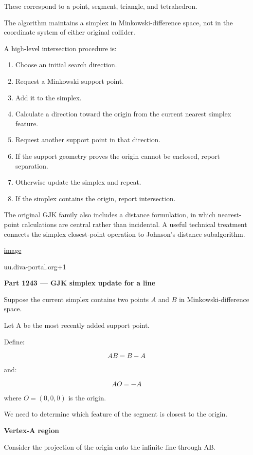 These correspond to a point, segment, triangle, and tetrahedron.

The algorithm maintains a simplex in Minkowski-difference space, not in the coordinate system of either original collider.

A high-level intersection procedure is:

\begin{enumerate}
\def\labelenumi{\arabic{enumi}.}
\tightlist
\item
  Choose an initial search direction.
\item
  Request a Minkowski support point.
\item
  Add it to the simplex.
\item
  Calculate a direction toward the origin from the current nearest simplex feature.
\item
  Request another support point in that direction.
\item
  If the support geometry proves the origin cannot be enclosed, report separation.
\item
  Otherwise update the simplex and repeat.
\item
  If the simplex contains the origin, report intersection.
\end{enumerate}

The original GJK family also includes a distance formulation, in which nearest-point calculations are central rather than incidental. A useful technical treatment connects the simplex closest-point operation to Johnson's distance subalgorithm. 

\href{https://www.google.com/s2/favicons?domain=https://uu.diva-portal.org&sz=32}{image}

uu.diva-portal.org+1

\textbf{Part 1243 --- GJK simplex update for a line}

Suppose the current simplex contains two points \(A\) and \(B\) in Minkowski-difference space.

Let A be the most recently added support point.

Define:

\[
AB=B-A
\]

and:

\[
AO=-A
\]

where \(O=(0,0,0)\) is the origin.

We need to determine which feature of the segment is closest to the origin.

\textbf{Vertex-A region}

Consider the projection of the origin onto the infinite line through AB.

